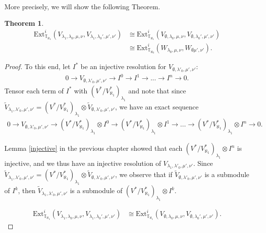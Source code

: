 \documentclass[openany, a4paper]{amsbook}
\newtheorem{thm}{Theorem}[chapter]
\theoremstyle{definition}
\numberwithin{equation}{chapter}
\newcommand{\T}[1]{{\mathbb{T}}_{\aleph_{#1}}}
\newcommand{\Ext}[4]{\mathrm{Ext}^{#1}_{#2}({#3}, {#4})}
\begin{document}
More precisely, we will show the following Theorem.
\begin{thm}\label{result2}
    \begin{align}
        \Ext{i}{\T{1}}{V_{\lambda_1, \lambda_0, \mu, \nu}}{V_{\lambda_1, \lambda_0', \mu', \nu'}} &\cong \Ext{i}{\T{1}}{V_{\emptyset, \lambda_0, \mu, \nu}}{V_{\emptyset, \lambda_0', \mu', \nu'}} \\
        &\cong  \Ext{i}{\T{0}}{W_{\lambda_0, \mu, \nu}}{W_{\emptyset\mu', \nu'}}.
    \end{align}
\end{thm}

\begin{proof}
    To this end, let $I^\ast$ be an injective resolution for $V_{\emptyset, \lambda'_0, \mu', \nu'}$:
    \begin{align*}
        0 \to V_{\emptyset, \lambda'_0, \mu', \nu'} \to I^0 \to I^1 \to ...\to I^n \to 0.
    \end{align*}
    Tensor each term of $I^*$ with $(V^\ast/V^\ast_{\aleph_1})_{\lambda_1}$  and note that since $\tilde{V}_{\lambda_1, \lambda'_0, \mu', \nu'} = (V^\ast/V^\ast_{\aleph_1})_{\lambda_1} \otimes \tilde{V}_{\emptyset, \lambda'_0, \mu', \nu'} $, we have an exact sequence
    \begin{align*}
        0 \to V_{\emptyset, \lambda'_0, \mu', \nu'} \to (V^\ast/V^\ast_{\aleph_1})_{\lambda_1} \otimes I^0 \to (V^\ast/V^\ast_{\aleph_1})_{\lambda_1} \otimes I^1 \to ...\to (V^\ast/V^\ast_{\aleph_1})_{\lambda_1} \otimes I^n \to 0.
    \end{align*}

    Lemma \ref{injective} in the previous chapter showed that each $(V^\ast/V^\ast_{\aleph_1})_{\lambda_1} \otimes I^n$ is injective, and we thus have an injective resolution of $V_{\lambda_1, \lambda'_0, \mu', \nu'}$. Since $\tilde{V}_{\lambda_1, \lambda'_0, \mu', \nu'} = (V^\ast/V^\ast_{\aleph_1})_{\lambda_1} \otimes \tilde{V}_{\emptyset, \lambda'_0, \mu', \nu'}$, we observe that if $\tilde{V}_{\emptyset, \lambda'_0, \mu', \nu'}$ is a submodule of $I^k$, then $\tilde{V}_{\lambda_1, \lambda'_0, \mu', \nu'}$ is a submodule of $(V^\ast/V^\ast_{\aleph_1})_{\lambda_1} \otimes I^k$. 

    \begin{align*}
        \Ext{i}{\T{1}}{V_{\lambda_1, \lambda_0, \mu, \nu}}{V_{\lambda_1, \lambda_0', \mu', \nu'}} &\cong \Ext{i}{\T{1}}{V_{\emptyset, \lambda_0, \mu, \nu}}{V_{\emptyset, \lambda_0', \mu', \nu'}}.
    \end{align*}
\end{proof}
\end{document}
